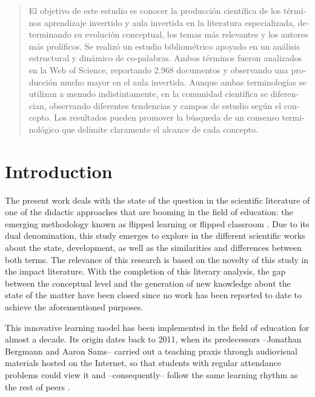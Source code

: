 \documentclass{textolivre}
\begin{document}
\begin{polyabstract}
\begin{spanish}
\begin{abstract}
El objetivo de este estudio es conocer la producción científica de los términos aprendizaje invertido y aula invertida en la literatura especializada, determinando su evolución conceptual, los temas más relevantes y los autores más prolíficos. Se realizó un estudio bibliométrico apoyado en un análisis estructural y dinámico de co-palabras. Ambos términos fueron analizados en la Web of Science, reportando 2.968 documentos y observando una producción mucho mayor en el aula invertida. Aunque ambas terminologías se utilizan a menudo indistintamente, en la comunidad científica se diferencian, observando diferentes tendencias y campos de estudio según el concepto. Los resultados pueden promover la búsqueda de un consenso terminológico que delimite claramente el alcance de cada concepto.

\end{abstract}
\end{spanish}

\end{polyabstract}


\section{Introduction}\label{sec-intro}
The present work deals with the state of the question in the scientific literature of one of the didactic approaches that are booming in the field of education: the emerging methodology known as flipped learning or flipped classroom \cite{cabi2018,chen_findings_2019,zainuddin_how_2019}. Due to its dual denomination, this study emerges to explore in the different scientific works about the state, development, as well as the similarities and differences between both terms. The relevance of this research is based on the novelty of this study in the impact literature. With the completion of this literary analysis, the gap between the conceptual level and the generation of new knowledge about the state of the matter have been closed since no work has been reported to date to achieve the aforementioned purposes. 

This innovative learning model has been implemented in the field of education for almost a decade. Its origin dates back to 2011, when its predecessors –Jonathan Bergmann and Aaron Sams– carried out a teaching praxis through audiovisual materials hosted on the Internet, so that students with regular attendance problems could view it and –consequently– follow the same learning rhythm as the rest of peers \cite{bergmann_flip_2012}. 
\end{document}
